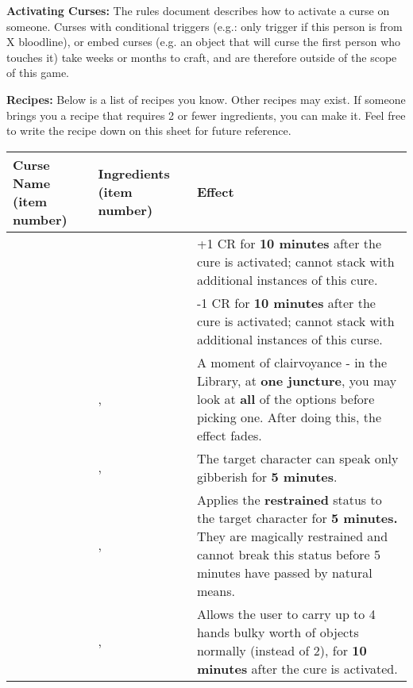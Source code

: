 \documentclass[green]{GL2020}
\begin{document}
\textbf{Activating Curses:}
The rules document describes how to activate a curse on someone. Curses with conditional triggers (e.g.: only trigger if this person is from X bloodline), or embed curses (e.g. an object that will curse the first person who touches it) take weeks or months to craft, and are therefore outside of the scope of this game.

\textbf{Recipes:}
Below is a list of recipes you know. Other recipes may exist. If someone brings you a recipe that requires 2 or fewer ingredients, you can make it. Feel free to write the recipe down on this sheet for future reference.

\begin{tabularx}{\textwidth}{| >{\centering\arraybackslash} m{4cm} | >{\centering\arraybackslash} m{4cm} | X |}
\hline
	\textbf{Curse Name (item number)} & \textbf{Ingredients (item number)}  & \textbf{Effect} \\
\hline
\hline
	\iCourage{}	&	\iMoonflower{} & +1 CR  for \textbf{10 minutes} after the cure is activated; cannot stack with additional instances of this cure.	\\
\hline
	\iWeakness{}	& \iNightshade{} &	-1 CR  for \textbf{10 minutes} after the cure is activated; cannot stack with additional instances of this curse. \\
\hline	
	\iInsight{}	& \iMorningGlory{}, \iEagleFeather{}	& A moment of clairvoyance - in the Library, at \textbf{one juncture}, you may look at \textbf{all} of the options before picking one. After doing this, the effect fades. \\
\hline	
	\iBabble{}	& \iClay{}, \iSpiderWeb{}	&	The target character can speak only gibberish for \textbf{5 minutes}. \\
\hline	
	\iRestraint{}	& \iSpiderWeb{}, \iLily{}	&	Applies the \textbf{restrained} status to the target character for \textbf{5 minutes.} They are magically restrained and cannot break this status before 5 minutes have passed by natural means.\\
\hline	
	\iStrength{}	&	\iSunflower{}, \iObsidian{} &	Allows the user to carry up to 4 hands bulky worth of objects normally (instead of 2), for \textbf{10 minutes} after the cure is activated. \\
\hline	
\end{tabularx}
\end{document}
